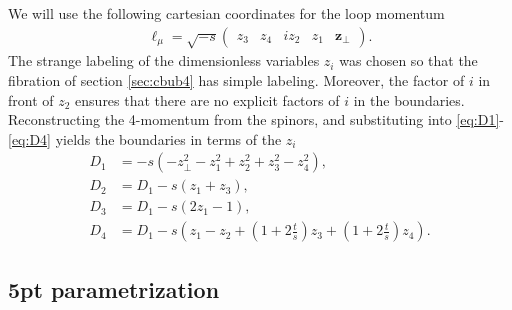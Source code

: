 \documentclass[11pt]{article}
\newcommand{\bs}[1]{\boldsymbol{#1}}
\begin{document}
We will use the following cartesian coordinates for the loop momentum
\begin{align}
	\ell_\mu = \sqrt{-s} \begin{pmatrix} z_3 & z_4 & i z_2 & z_1 & \bs{z}_\perp  \end{pmatrix}.
\end{align}
The strange labeling of the dimensionless variables $z_i$ was chosen so that the fibration of section \ref{sec:cbub4} has simple labeling. Moreover, the factor of $i$ in front of $z_2$ ensures that there are no explicit factors of $i$ in the boundaries. Reconstructing the 4-momentum from the spinors,
and substituting into \eqref{eq:D1}-\eqref{eq:D4} yields the boundaries in terms of the $z_i$
\begin{align}
	D_1 &= -s\left( {-}z_\perp^2 {-} z_1^2 {+} z_2^2 {+} z_3^2 {-} z_4^2 \right),
	\\
	D_2 &= D_1 {-} s\left( z_1 {+} z_3 \right),
	\\
	D_3 &= D_1 {-} s\left( 2z_1 {-} 1 \right),
	\\
	D_4 &= D_1 {-} s\left( z_1 {-} z_2 + \left(1{+}2\frac{t}{s}\right) z_3 {+} \left(1{+}2\frac{t}{s}\right) z_4 \right).
\end{align}



\subsection{5pt parametrization \label{app:5pt param} }
\end{document}
